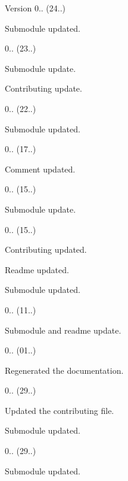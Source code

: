 \begin{DoxyVersion}{Version}
0.. (24..)
\begin{DoxyItemize}
\item Submodule updated. 
\end{DoxyItemize}

0.. (23..)
\begin{DoxyItemize}
\item Submodule update.
\item Contributing update. 
\end{DoxyItemize}

0.. (22..)
\begin{DoxyItemize}
\item Submodule updated. 
\end{DoxyItemize}

0.. (17..)
\begin{DoxyItemize}
\item Comment updated. 
\end{DoxyItemize}

0.. (15..)
\begin{DoxyItemize}
\item Submodule update. 
\end{DoxyItemize}

0.. (15..)
\begin{DoxyItemize}
\item Contributing updated.
\item Readme updated.
\item Submodule updated. 
\end{DoxyItemize}

0.. (11..)
\begin{DoxyItemize}
\item Submodule and readme update. 
\end{DoxyItemize}

0.. (01..)
\begin{DoxyItemize}
\item Regenerated the documentation. 
\end{DoxyItemize}

0.. (29..)
\begin{DoxyItemize}
\item Updated the contributing file.
\item Submodule updated. 
\end{DoxyItemize}

0.. (29..)
\begin{DoxyItemize}
\item Submodule updated. 
\end{DoxyItemize}


\end{DoxyVersion}
